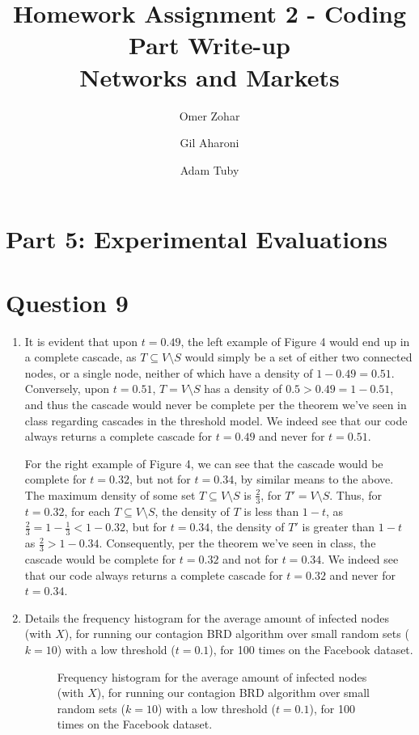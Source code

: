 \documentclass{article}
\title{
    Homework Assignment 2 - Coding Part Write-up\\
    Networks and Markets
}
\author{
    Omer Zohar
    \and
    Gil Aharoni
    \and
    Adam Tuby
}
\begin{document}
\maketitle

\section*{Part 5: Experimental Evaluations}
\setcounter{section}{0}

\section{Question 9}

\begin{enumerate}[label=(\alph*)]
    \item It is evident that upon $t = 0.49$, the left example of Figure 4 would end up in a complete cascade, as $T \subseteq V \setminus S$ would simply be a set of either two connected nodes, or a single node, neither of which have a density of $1 - 0.49 = 0.51$. Conversely, upon $t = 0.51$, $T = V \setminus S$ has a density of $0.5 > 0.49 = 1 - 0.51$, and thus the cascade would never be complete per the theorem we've seen in class regarding cascades in the threshold model. We indeed see that our code always returns a complete cascade for $t = 0.49$ and never for $t = 0.51$.
    
    For the right example of Figure 4, we can see that the cascade would be complete for $t = 0.32$, but not for $t = 0.34$, by similar means to the above. The maximum density of some set $T \subseteq V \setminus S$ is $\frac{2}{3}$, for $T' = V \setminus S$. Thus, for $t = 0.32$, for each $T \subseteq V \setminus S$, the density of $T$ is less than $1 - t$, as $\frac{2}{3} = 1 - \frac{1}{3} < 1 - 0.32$, but for $t = 0.34$, the density of $T'$ is greater than $1 - t$ as $\frac{2}{3} > 1 - 0.34$. Consequently, per the theorem we've seen in class, the cascade would be complete for $t = 0.32$ and not for $t = 0.34$. We indeed see that our code always returns a complete cascade for $t = 0.32$ and never for $t = 0.34$.
    
    \item {} Details the frequency histogram for the average amount of infected nodes (with $X$), for running our contagion BRD algorithm over small random sets ($k = 10$) with a low threshold ($t = 0.1$), for 100 times on the Facebook dataset.
    
    \begin{figure*}[h]
        \centering
        \resizebox{0.6\textwidth}{!}{
            
        }
        \caption{Frequency histogram for the average amount of infected nodes (with $X$), for running our contagion BRD algorithm over small random sets ($k = 10$) with a low threshold ($t = 0.1$), for 100 times on the Facebook dataset.}
        \label{fig:q9b}
    \end{figure*}


\end{enumerate}
\end{document}
